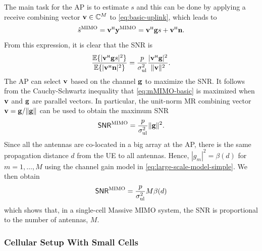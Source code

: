 The main task for the \gls{AP} is to estimate $s$ and this can be done by applying a receive combining vector $\mathbf{v} \in \mathbb{C}^M$ to \eqref{eq:basic-uplink}, which leads to
\begin{equation} \label{eq:s-estimate-MIMO}
\hat{s}^{\textrm{MIMO}}  = \vect{v}^{\Htran} \vect{y}^{\textrm{MIMO}}  =  \vect{v}^{\Htran} \vect{g} s + \vect{v}^{\Htran}\vect{n}.
\end{equation}
From this expression, it is clear that the \gls{SNR} is
\begin{equation} \label{eq:mMIMO-basic}
 \frac{\mathbb{E}\{ | \vect{v}^{\Htran} \vect{g} s|^2   \} }{ \mathbb{E} \{ | \vect{v}^{\Htran}\vect{n} |^2 \}} = \frac{p}{\sigmaUL} \frac{ | \vect{v}^{\Htran} \vect{g} |^2   }{ \| \vect{v} \|^2}.
\end{equation}
The \gls{AP} can select $\mathbf{v}$ based on the channel $\mathbf{g}$ to maximize the \gls{SNR}. It follows from the Cauchy-Schwartz inequality that \eqref{eq:mMIMO-basic} is maximized when $\mathbf{v}$ and $\mathbf{g}$ are parallel vectors. In particular, the unit-norm \gls{MR} combining vector $\mathbf{v} = \mathbf{g} / \| \mathbf{g} \|$ can be used to obtain the maximum \gls{SNR}
\begin{equation}
\mathsf{SNR}^{\textrm{MIMO}}  = \frac{p}{\sigma^2_{\mathrm{ul}}} \| \mathbf{g}\|^2.
\end{equation}
Since all the antennas are co-located in a big array at the \gls{AP}, there is the same propagation distance $d$ from the \gls{UE} to all antennas. Hence, $|g_m|^2 = \beta(d) $ for $m=1,\ldots,M$ using the channel gain model in \eqref{eq:large-scale-model-simple}.
We then obtain
\begin{equation} \label{eq:SNR-simple-mMIMO}
\mathsf{SNR}^{\textrm{MIMO}}  = \frac{p}{\sigma^2_{\mathrm{ul}}} M \beta(d)
\end{equation}
which shows that, in a single-cell Massive \gls{MIMO} system, the \gls{SNR} is proportional to the number of antennas, $M$.

\subsubsection{Cellular Setup With Small Cells}

